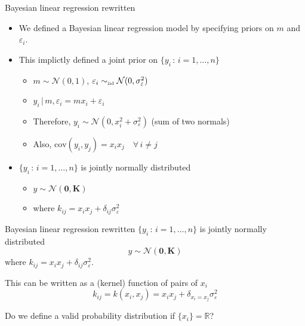 \begin{frame}{Bayesian linear regression rewritten}
  \begin{itemize}
    \item We defined a Bayesian linear regression model by specifying priors on $m$ and $\varepsilon_i$.
    \vspace{\baselineskip}
    \pause
    \item This implictly defined a joint prior on $\{y_i \,:\, i=1,\ldots,n\}$
    \pause
    \begin{itemize}
      \item $m \sim \mathcal{N}(0, 1)$, $\varepsilon_i \sim_{\mbox{\tiny iid}} \mathcal{N}(0, \sigma_\varepsilon^2)$
      \pause
      \item $y_i \,|\, m, \varepsilon_i = mx_i + \varepsilon_i$
      \pause
      \item Therefore, $y_i \sim \mathcal{N}(0, x_i^2 + \sigma_\varepsilon^2)$ (sum of two normals)
      \pause
      \item Also, $\textrm{cov}(y_i, y_j) = x_i x_j \quad \forall\,i\neq j$
    \end{itemize}
    \vspace{\baselineskip}
    \pause
    \item \ie $\{y_i \,:\, i=1,\ldots,n\}$ is jointly normally distributed
    \begin{itemize}
      \item $y \sim \mathcal{N}(\mathbf{0}, \mathbf{K})$
      \item where $k_{ij} = x_i x_j + \delta_{ij} \sigma_\varepsilon^2$
    \end{itemize}
  \end{itemize}
\end{frame}

\begin{frame}{Bayesian linear regression rewritten}
  $\{y_i \,:\, i=1,\ldots,n\}$ is jointly normally distributed
  \begin{equation*}
    y \sim \mathcal{N}(\mathbf{0}, \mathbf{K})
  \end{equation*}
  where $k_{ij} = x_i x_j + \delta_{ij} \sigma_\varepsilon^2$.
  
  \vspace{\baselineskip}
  \pause
  
  This can be written as a (kernel) function of pairs of $x_i$
  \begin{equation*}
    k_{ij} = k(x_i, x_j) = x_i x_j + \delta_{x_i = x_j}\sigma_\varepsilon^2
  \end{equation*}
  
  \vspace{\baselineskip}
  \pause
  
  Do we define a valid probability distribution if $\{x_i\} = \mathbb{R}$?
\end{frame}

